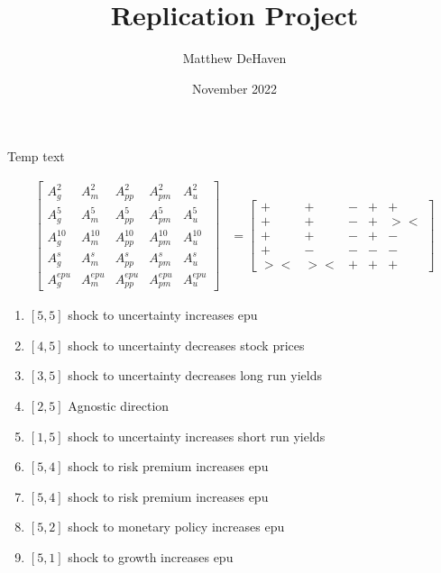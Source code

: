 \documentclass{article}
\title{Replication Project}
\author{Matthew DeHaven}
\date{November 2022}
\begin{document}
\maketitle

Temp text

\begin{align*}
    \begin{bmatrix}
        A_g^2      & A_m^2     & A_{pp}^2     & A_{pm}^2     & A_{u}^2 \\
        A_g^5      & A_m^5     & A_{pp}^5     & A_{pm}^5     & A_{u}^5 \\
        A_g^{10}   & A_m^{10}  & A_{pp}^{10}  & A_{pm}^{10}  & A_{u}^{10} \\
        A_g^s      & A_m^s     & A_{pp}^s     & A_{pm}^s     & A_{u}^s \\
        A_g^{epu}  & A_m^{epu} & A_{pp}^{epu} & A_{pm}^{epu} & A_{u}^{epu} 
    \end{bmatrix}
    &=
    \begin{bmatrix}
        + & + & - & + & + \\
        + & + & - & + & >< \\
        + & + & - & + & - \\
        + & - & - & - & - \\
        >< & >< & + & + & + 
    \end{bmatrix}
\end{align*}

\begin{enumerate}
    \item $[5,5]$ shock to uncertainty increases epu
    \item $[4,5]$ shock to uncertainty decreases stock prices
    \item $[3,5]$ shock to uncertainty decreases long run yields
    \item $[2,5]$ Agnostic direction
    \item $[1,5]$ shock to uncertainty increases short run yields
    \item $[5,4]$ shock to risk premium increases epu
    \item $[5,4]$ shock to risk premium increases epu 
    \item $[5,2]$ shock to monetary policy increases epu
    \item $[5,1]$ shock to growth increases epu 
\end{enumerate}
\end{document}
